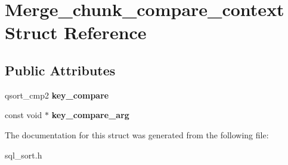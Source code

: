 \hypertarget{structMerge__chunk__compare__context}{}\section{Merge\+\_\+chunk\+\_\+compare\+\_\+context Struct Reference}
\label{structMerge__chunk__compare__context}
\subsection*{Public Attributes}
\begin{DoxyCompactItemize}
\item 
\mbox{\label{structMerge__chunk__compare__context_a636ae1e367df5a83a85e94da685dfed1}} 
qsort\+\_\+cmp2 {\bfseries key\+\_\+compare}
\item 
\mbox{\label{structMerge__chunk__compare__context_a52a5ffd68db604462fde9e70f8e24986}} 
const void $\ast$ {\bfseries key\+\_\+compare\+\_\+arg}
\end{DoxyCompactItemize}


The documentation for this struct was generated from the following file\+:\begin{DoxyCompactItemize}
\item 
sql\+\_\+sort.\+h\end{DoxyCompactItemize}
